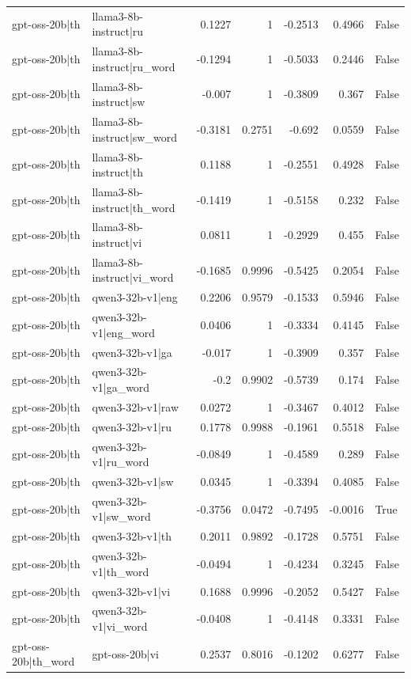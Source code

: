 \begin{table}
\begin{tabular}{l l r r r r l}
gpt-oss-20b|th & llama3-8b-instruct|ru & 0.1227 & 1 & -0.2513 & 0.4966 & False \\
gpt-oss-20b|th & llama3-8b-instruct|ru_word & -0.1294 & 1 & -0.5033 & 0.2446 & False \\
gpt-oss-20b|th & llama3-8b-instruct|sw & -0.007 & 1 & -0.3809 & 0.367 & False \\
gpt-oss-20b|th & llama3-8b-instruct|sw_word & -0.3181 & 0.2751 & -0.692 & 0.0559 & False \\
gpt-oss-20b|th & llama3-8b-instruct|th & 0.1188 & 1 & -0.2551 & 0.4928 & False \\
gpt-oss-20b|th & llama3-8b-instruct|th_word & -0.1419 & 1 & -0.5158 & 0.232 & False \\
gpt-oss-20b|th & llama3-8b-instruct|vi & 0.0811 & 1 & -0.2929 & 0.455 & False \\
gpt-oss-20b|th & llama3-8b-instruct|vi_word & -0.1685 & 0.9996 & -0.5425 & 0.2054 & False \\
gpt-oss-20b|th & qwen3-32b-v1|eng & 0.2206 & 0.9579 & -0.1533 & 0.5946 & False \\
gpt-oss-20b|th & qwen3-32b-v1|eng_word & 0.0406 & 1 & -0.3334 & 0.4145 & False \\
gpt-oss-20b|th & qwen3-32b-v1|ga & -0.017 & 1 & -0.3909 & 0.357 & False \\
gpt-oss-20b|th & qwen3-32b-v1|ga_word & -0.2 & 0.9902 & -0.5739 & 0.174 & False \\
gpt-oss-20b|th & qwen3-32b-v1|raw & 0.0272 & 1 & -0.3467 & 0.4012 & False \\
gpt-oss-20b|th & qwen3-32b-v1|ru & 0.1778 & 0.9988 & -0.1961 & 0.5518 & False \\
gpt-oss-20b|th & qwen3-32b-v1|ru_word & -0.0849 & 1 & -0.4589 & 0.289 & False \\
gpt-oss-20b|th & qwen3-32b-v1|sw & 0.0345 & 1 & -0.3394 & 0.4085 & False \\
gpt-oss-20b|th & qwen3-32b-v1|sw_word & -0.3756 & 0.0472 & -0.7495 & -0.0016 & True \\
gpt-oss-20b|th & qwen3-32b-v1|th & 0.2011 & 0.9892 & -0.1728 & 0.5751 & False \\
gpt-oss-20b|th & qwen3-32b-v1|th_word & -0.0494 & 1 & -0.4234 & 0.3245 & False \\
gpt-oss-20b|th & qwen3-32b-v1|vi & 0.1688 & 0.9996 & -0.2052 & 0.5427 & False \\
gpt-oss-20b|th & qwen3-32b-v1|vi_word & -0.0408 & 1 & -0.4148 & 0.3331 & False \\
gpt-oss-20b|th_word & gpt-oss-20b|vi & 0.2537 & 0.8016 & -0.1202 & 0.6277 & False \\

\end{tabular}
\end{table}

